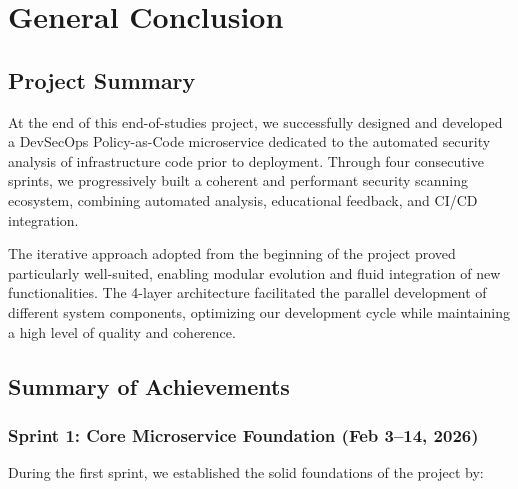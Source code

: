 
\chapter*{General Conclusion}

\section*{Project Summary}

At the end of this end-of-studies project, we successfully designed and developed a DevSecOps Policy-as-Code microservice dedicated to the automated security analysis of infrastructure code prior to deployment. Through four consecutive sprints, we progressively built a coherent and performant security scanning ecosystem, combining automated analysis, educational feedback, and CI/CD integration.

The iterative approach adopted from the beginning of the project proved particularly well-suited, enabling modular evolution and fluid integration of new functionalities. The 4-layer architecture facilitated the parallel development of different system components, optimizing our development cycle while maintaining a high level of quality and coherence.

\section*{Summary of Achievements}

\subsection*{Sprint 1: Core Microservice Foundation (Feb 3--14, 2026)}

During the first sprint, we established the solid foundations of the project by:

